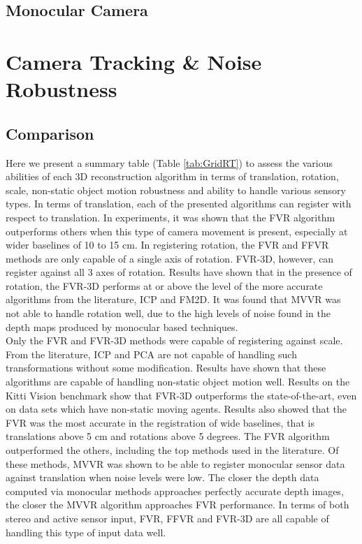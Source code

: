 \subsection{Monocular Camera}
\label{Sec:MonocularSOTA}


\section{Camera Tracking \& Noise Robustness}
\label{Sec:CamTransTrackExp}


\subsection{Comparison}

Here we present a summary table (Table \ref{tab:GridRT}) to assess the various abilities of each 3D reconstruction algorithm in terms of translation, rotation, scale, non-static object motion robustness and ability to handle various sensory types. In terms of translation, each of the presented algorithms can register with respect to translation. In experiments, it was shown that the FVR algorithm outperforms others when this type of camera movement is present, especially at wider baselines of 10 to 15 cm. In registering rotation, the FVR and FFVR methods are only capable of a single axis of rotation. FVR-3D, however, can register against all 3 axes of rotation. Results have shown that in the presence of rotation, the FVR-3D performs at or above the level of the more accurate algorithms from the literature, ICP and FM2D. It was found that MVVR was not able to handle rotation well, due to the high levels of noise found in the depth maps produced by monocular based techniques. \\

Only the FVR and FVR-3D methods were capable of registering against scale. From the literature, ICP and PCA are not capable of handling such transformations without some modification. Results have shown that these algorithms are capable of handling non-static object motion well. Results on the Kitti Vision benchmark show that FVR-3D outperforms the state-of-the-art, even on data sets which have non-static moving agents. Results also showed that the FVR was the most accurate in the registration of wide baselines, that is translations above 5 cm and rotations above 5 degrees. The FVR algorithm outperformed the others, including the top methods used in the literature. Of these methods, MVVR was shown to be able to register monocular sensor data against translation when noise levels were low. The closer the depth data computed via monocular methods approaches perfectly accurate depth images, the closer the MVVR algorithm approaches FVR performance. In terms of both stereo and active sensor input, FVR, FFVR and FVR-3D are all capable of handling this type of input data well. \\


